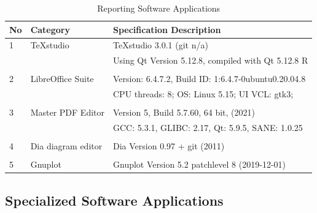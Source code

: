 \begin{table}[ht]
\caption{Reporting Software Applications}
\label{chap3-Reporting Software Applications}
	
\begin{tabular}{p{0.5cm} p{4.30cm} p{9.2cm} }
\hline	
\textbf{No} & \textbf{Category}   &    \textbf{Specification Description}\\
\hline
1 &	TeXstudio             & TeXstudio 3.0.1 (git n/a)  \\
  &                       & Using Qt Version 5.12.8, compiled with Qt 5.12.8 R   \\
  &                       &    \\
2 &	LibreOffice Suite     & Version: 6.4.7.2, Build ID: 1:6.4.7-0ubuntu0.20.04.8 \\
  &                       & CPU threads: 8; OS: Linux 5.15; UI VCL: gtk3; \\
  &                       &    \\ 
3 & Master PDF Editor     & Version 5, Build 5.7.60, 64 bit, (2021)  \\
  &                       & GCC: 5.3.1, GLIBC: 2.17, Qt: 5.9.5, SANE: 1.0.25  \\ 	
  &                       &    \\
4 &	Dia diagram editor    & Dia Version 0.97 + git (2011)\\
  &                       &    \\
5 & Gnuplot               & Gnuplot Version 5.2 patchlevel 8 (2019-12-01) \\ 
\hline
\end{tabular}
\end{table}

\subsection{Specialized Software Applications}

